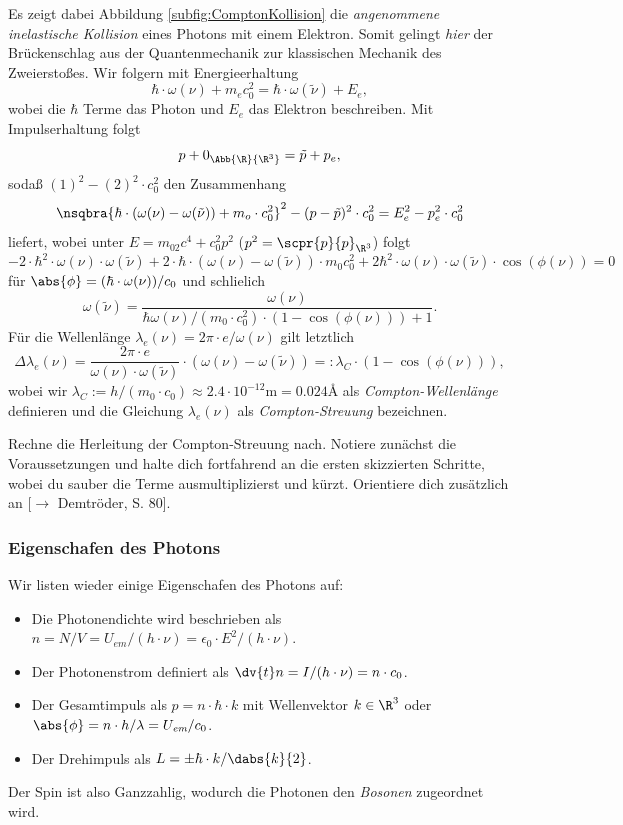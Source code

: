 \documentclass{article}
\begin{document}
        Es zeigt dabei Abbildung \ref{subfig:ComptonKollision} die \emph{angenommene inelastische Kollision} eines Photons mit einem Elektron. Somit gelingt \emph{hier} der Brückenschlag aus der Quantenmechanik zur klassischen Mechanik des Zweierstoßes. Wir folgern mit Energieerhaltung
        \[\hbar\cdot\omega(\nu) + m_ec_0^2 = \hbar\cdot\omega(\tilde\nu) + E_e,\]
        wobei die $\hbar$ Terme das Photon und $E_e$ das Elektron beschreiben. Mit Impulserhaltung folgt
        \[p + 0_\Abb{\R}{\R^3} = \tilde p + p_e,\]
        sodaß $(1)^2 - (2)^2\cdot c_0^2$ den Zusammenhang
        \[\nsqbra{\hbar\cdot(\omega(\nu)-\omega(\tilde\nu)) + m_o\cdot c_0^2}^2 - (p-\tilde p)^2\cdot c_0^2 = E_e^2 - p_e^2\cdot c_0^2\]
        liefert, wobei unter $E=m_02c^4+c_0^2p^2$ ($p^2 = \scpr{p}{p}_{\R^3}$) folgt
        \[-2\cdot\hbar^2\cdot\omega(\nu)\cdot\omega(\tilde\nu) + 2\cdot\hbar\cdot(\omega(\nu)-\omega(\tilde\nu))\cdot m_0c_0^2 + 2\hbar^2\cdot\omega(\nu)\cdot\omega(\tilde\nu)\cdot\cos(\phi(\nu)) = 0\]
        für $\abs{\phi} = (\hbar\cdot\omega(\nu))/c_0$ und schlielich  
        \[\omega(\tilde\nu) = \frac{\omega(\nu)}{\hbar\omega(\nu)/(m_0\cdot c_0^2)\cdot (1-\cos(\phi(\nu))) + 1}.\]
        Für die Wellenlänge $\lambda_e(\nu) = 2\pi\cdot e/\omega(\nu)$ gilt letztlich 
        \[\Delta\lambda_e(\nu) = \frac{2\pi\cdot e}{\omega(\nu)\cdot\omega(\tilde\nu)}\cdot(\omega(\nu)-\omega(\tilde\nu)) =: \lambda_C\cdot (1-\cos(\phi(\nu))),\]
        wobei wir $\lambda_C:=h/(m_0\cdot c_0)\approx 2.4\cdot 10^{-12}\si\metre = 0.024\si\angstrom$ als \emph{Compton-Wellenlänge} definieren und die Gleichung $\lambda_e(\nu)$ als \emph{Compton-Streuung} bezeichnen. 
        
        \begin{Aufgabe}
            \nr{} Rechne die Herleitung der Compton-Streuung nach. Notiere zunächst die Voraussetzungen und halte dich fortfahrend an die ersten skizzierten Schritte, wobei du sauber die Terme ausmultiplizierst und kürzt. Orientiere dich zusätzlich an [$\to$ Demtröder, S. 80].
        \end{Aufgabe}

        \subsubsection*{Eigenschafen des Photons}
            Wir listen wieder einige Eigenschafen des Photons auf:
            \begin{itemize}
                \item Die Photonendichte wird beschrieben als $n = N/V = U_\textit{em} / (h\cdot\nu) = \epsilon_0\cdot E^2 / (h\cdot\nu)$.
                \item Der Photonenstrom definiert als $\dv{t} n = I/(h\cdot\nu) = n\cdot c_0$.
                \item Der Gesamtimpuls als $p = n\cdot\hbar\cdot k$ mit Wellenvektor $k\in\R^3$ oder $\abs{\phi} = n\cdot h/\lambda = U_\textit{em} / c_0$. 
                \item Der Drehimpuls als $L = \pm \hbar\cdot k / \dabs{k}{2}$. 
            \end{itemize}
            Der Spin ist also Ganzzahlig, wodurch die Photonen den \emph{Bosonen} zugeordnet wird. 
\end{document}
